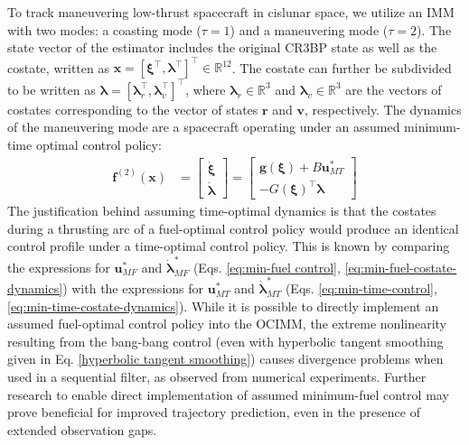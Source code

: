 \documentclass[letterpaper, preprint, paper,11pt]{AAS}	%
\newcommand{\R}{\mathbb{R}}
\begin{document}
To track maneuvering low-thrust spacecraft in cislunar space, we utilize an IMM with two modes: a coasting mode ($\tau=1$) and a maneuvering mode ($\tau=2$). The state vector of the estimator includes the original CR3BP state as well as the costate, written as $\bm{x} = [\bm{\xi}^\top, \bm{\lambda}^\top]^\top \in \R^{12}$. The costate can further be subdivided to be written as $\bm{\lambda} = [\bm{\lambda}_r^\top, \bm{\lambda}_v^\top]^\top$, where $\bm{\lambda}_r \in \R^3$ and $\bm{\lambda}_v \in \R^3$ are the vectors of costates corresponding to the vector of states $\bm{r}$ and $\bm{v}$, respectively. The dynamics of the maneuvering mode are a spacecraft operating under an assumed minimum-time optimal control policy:
\begin{align}
    \bm{f}^{(2)}(\bm{x}) &= \begin{bmatrix}
        \dot{\bm{\xi}} \\
        \dot{\bm{\lambda}}
    \end{bmatrix} = \begin{bmatrix}
        \bm{g}(\bm{\xi}) + B \bm{u}^*_{MT} \\
        -G(\bm{\xi})^\top \bm{\lambda}
    \end{bmatrix}
\end{align}
The justification behind assuming time-optimal dynamics is that the costates during a thrusting arc of a fuel-optimal control policy would produce an identical control profile under a time-optimal control policy. This is known by comparing the expressions for $\bm{u}^*_{MF}$ and $\dot{\bm{\lambda}}_{MF}^*$ (Eqs. \ref{eq:min-fuel control}, \ref{eq:min-fuel-costate-dynamics}) with the expressions for $\bm{u}^*_{MT}$ and $\dot{\bm{\lambda}}_{MT}^*$ (Eqs. \ref{eq:min-time-control}, \ref{eq:min-time-costate-dynamics}). While it is possible to directly implement an assumed fuel-optimal control policy into the OCIMM, the extreme nonlinearity resulting from the bang-bang control (even with hyperbolic tangent smoothing given in Eq. \ref{hyperbolic tangent smoothing}) causes divergence problems when used in a sequential filter, as observed from numerical experiments. Further research to enable direct implementation of assumed minimum-fuel control may prove beneficial for improved trajectory prediction, even in the presence of extended observation gaps. 
\end{document}
